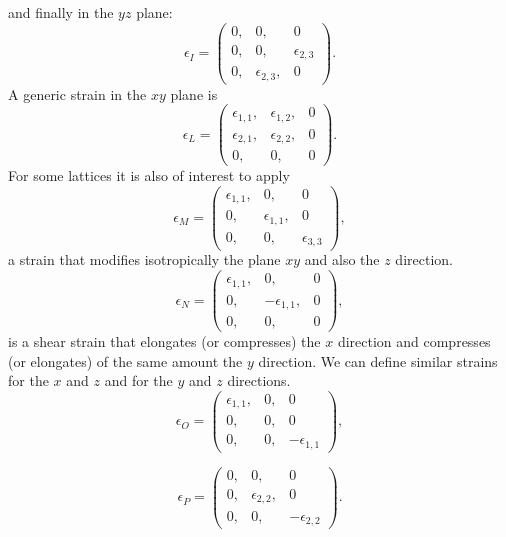 \documentclass[12pt,a4paper,twoside]{report}
\begin{document}
and finally in the $yz$ plane:
\begin{equation}
\epsilon_I=\left( \begin{array}{ccc}
0, & 0, & 0
\\
0, & 0, & \epsilon_{2,3} 
\\
0, & \epsilon_{2,3}, & 0
\end{array}
\right).
\end{equation}
A generic strain in the $xy$ plane is
\begin{equation}
\epsilon_L=\left( \begin{array}{ccc}
\epsilon_{1,1}, & \epsilon_{1,2}, & 0 
\\
\epsilon_{2,1}, & \epsilon_{2,2}, & 0 
\\
0, & 0, & 0
\end{array}
\right).
\end{equation}
For some lattices it is also of interest to apply
\begin{equation}
\epsilon_M=\left( \begin{array}{ccc}
\epsilon_{1,1}, & 0, & 0 
\\
0, & \epsilon_{1,1}, & 0 
\\
0, & 0, & \epsilon_{3,3}
\end{array}
\right),
\end{equation}
a strain that modifies isotropically the plane $xy$ and also the $z$ direction.
\begin{equation}
\epsilon_N=\left( \begin{array}{ccc}
\epsilon_{1,1}, & 0, & 0 
\\
0, & -\epsilon_{1,1}, & 0 
\\
0, & 0, & 0
\end{array}
\right),
\end{equation}
is a shear strain that elongates (or compresses) the $x$ direction and
compresses (or elongates) of the same amount the $y$ direction.
We can define similar strains for the $x$ and $z$ and for 
the $y$ and $z$ directions.
\begin{equation}
\epsilon_O=\left( \begin{array}{ccc}
\epsilon_{1,1}, & 0, & 0 
\\
0, & 0, & 0 
\\
0, & 0, & -\epsilon_{1,1}
\end{array}
\right),
\end{equation}

\begin{equation}
\epsilon_P=\left( \begin{array}{ccc}
0, & 0, & 0 
\\
0, & \epsilon_{2,2}, & 0 
\\
0, & 0, & -\epsilon_{2,2}
\end{array}
\right).
\end{equation}
\end{document}
